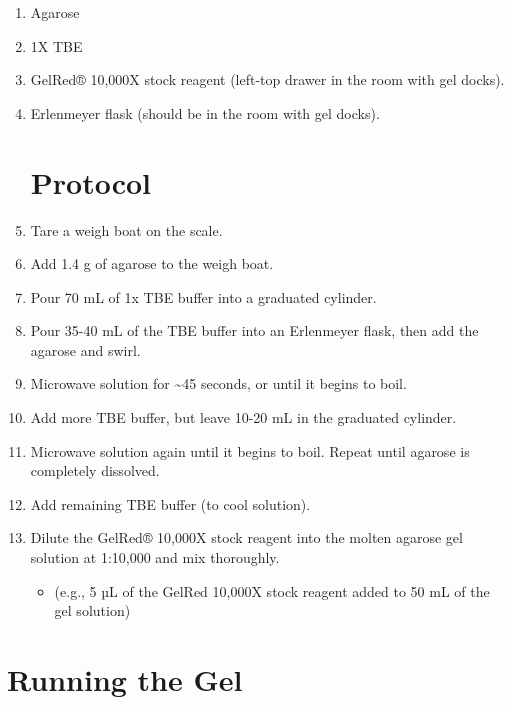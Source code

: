 \documentclass[
  letterpaper,
  DIV=11,
  numbers=noendperiod]{scrreprt}
\providecommand{\tightlist}{%
  \setlength{\itemsep}{0pt}\setlength{\parskip}{0pt}}\usepackage{longtable,booktabs,array}
\begin{document}

\begin{enumerate}
\def\labelenumi{\arabic{enumi}.}
\item
  Agarose
\item
  1X TBE
\item
  GelRed® 10,000X stock reagent (left-top drawer in the room with gel
  docks).
\item
  Erlenmeyer flask (should be in the room with gel docks).

  \hypertarget{protocol-3}{%
  \section*{Protocol}\label{protocol-3}}

\item
  Tare a weigh boat on the scale.
\item
  Add 1.4 g of agarose to the weigh boat.
\item
  Pour 70 mL of 1x TBE buffer into a graduated cylinder.
\item
  Pour 35-40 mL of the TBE buffer into an Erlenmeyer flask, then add the
  agarose and swirl.
\item
  Microwave solution for \textasciitilde45 seconds, or until it begins
  to boil.
\item
  Add more TBE buffer, but leave 10-20 mL in the graduated cylinder.
\item
  Microwave solution again until it begins to boil. Repeat until agarose
  is completely dissolved.
\item
  Add remaining TBE buffer (to cool solution).
\item
  Dilute the GelRed® 10,000X stock reagent into the molten agarose gel
  solution at 1:10,000 and mix thoroughly.

  \begin{itemize}
  \tightlist
  \item
    (e.g., 5 µL of the GelRed 10,000X stock reagent added to 50 mL of
    the gel solution)
  \end{itemize}
\end{enumerate}

\hypertarget{running-the-gel}{%
\section*{\texorpdfstring{\textbf{Running the
Gel}}{Running the Gel}}\label{running-the-gel}}
\end{document}
